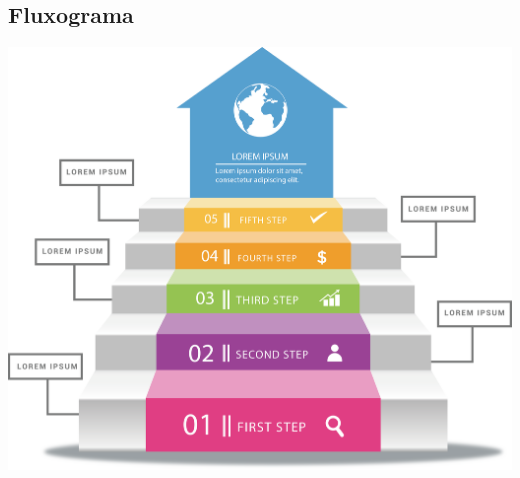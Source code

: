 \subsection{Fluxograma}\label{subsec:fluxograma}

\includegraphics[max width=\linewidth, max height=\textheight]{conteudo/anexos/fluxograma.png}

